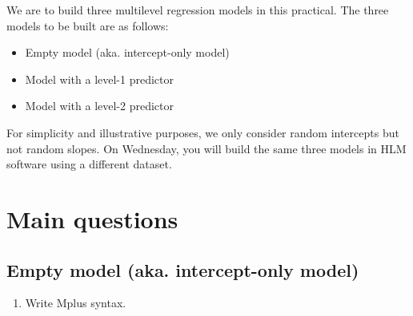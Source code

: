 \documentclass[
]{book}
\providecommand{\tightlist}{%
  \setlength{\itemsep}{0pt}\setlength{\parskip}{0pt}}
\begin{document}
We are to build three multilevel regression models in this practical. The three models to be built are as follows:

\begin{itemize}
\tightlist
\item
  Empty model (aka. intercept-only model)
\item
  Model with a level-1 predictor
\item
  Model with a level-2 predictor
\end{itemize}

For simplicity and illustrative purposes, we only consider random intercepts but not random slopes. On Wednesday, you will build the same three models in HLM software using a different dataset.

\hypertarget{main-questions-3}{%
\section{Main questions}\label{main-questions-3}}

\hypertarget{empty-model-aka.-intercept-only-model}{%
\subsection{Empty model (aka. intercept-only model)}\label{empty-model-aka.-intercept-only-model}}

\begin{enumerate}
\def\labelenumi{\arabic{enumi}.}
\tightlist
\item
  Write Mplus syntax.
\end{enumerate}
\end{document}
